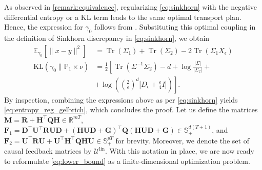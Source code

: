 \documentclass[letterpaper, 10 pt, conference]{ieeeconf}  %
\makeatletter
\renewenvironment{proof}[1][\proofname]{\par
  \pushQED{\qed}%
  \normalfont \topsep\z@
  \trivlist
  \item[\hskip2em
        \itshape
    #1\@addpunct{:}]\ignorespaces
}{%
  \popQED\endtrivlist\@endpefalse
}
\theoremstyle{ieeeconf}
\DeclareMathOperator{\Tr}{Tr}
\newcommand{\Prob}{\mathbb{P}}
\newcommand{\E}{\mathbb{E}}
\makeatother
\begin{document}
\begin{proof}
As observed in \cref{remark:equivalence}, regularizing \eqref{eq:sinkhorn} with the negative differential entropy or a KL term leads to the same optimal transport plan. Hence, the expression for $\gamma_0$ follows from \cite[Theorem 2.2]{del2020statistical}. Substituting this optimal coupling in the definition of Sinkhorn discrepancy in \eqref{eq:sinkhorn}, we obtain 
\begin{align*}
    \E_{\gamma_0}[\|x-y\|^2] &= \Tr(\Sigma_1) + \Tr(\Sigma_2) - 2\Tr(\Sigma_1X_\epsilon)
    \\
    \mathrm{KL}(\gamma_0 \| \Prob_1\times\nu) &= \frac{1}{2}\left[\Tr(\Sigma^{-1}\Sigma_2) - d + \log\frac{|\Sigma|}{|\Sigma_2|} + \right.
    \\
    &\left.+\log\left(\left(\frac{2}{\epsilon}\right)^d\left|D_\epsilon + \frac{\epsilon}{4}I\right|\right)\right].
\end{align*}
By inspection, combining the expressions above as per \eqref{eq:sinkhorn} yields \eqref{eq:entropy_reg_gelbrich}, which concludes the proof.
\end{proof}
Let us define the matrices $\mathbf{M} = \mathbf{R}+\mathbf{H}^{\top} \mathbf{Q H} \in \mathbb{R}^{m T}$, $\mathbf{F}_1 = \mathbf{D}^\top\mathbf{U}^\top\mathbf{R}\mathbf{U}\mathbf{D} +(\mathbf{HUD}+\mathbf{G})^\top\!\mathbf{Q}(\mathbf{HUD} + \mathbf{G}) \in \mathbb{S}_+^{d(T+1)}$, and $\mathbf{F}_{2}=\mathbf{U}^{\top} \mathbf{R} \mathbf{U}+\mathbf{U}^{\top} \mathbf{H}^{\top} \mathbf{Q H U} \in \mathbb{S}_+^{p T}$ for brevity. Moreover, we denote the set of causal feedback matrices by $\mathcal{U}^\text{lin}$. With this notation in place, we are now ready to reformulate \eqref{eq:lower_bound} as a finite-dimensional optimization problem. 
\end{document}
